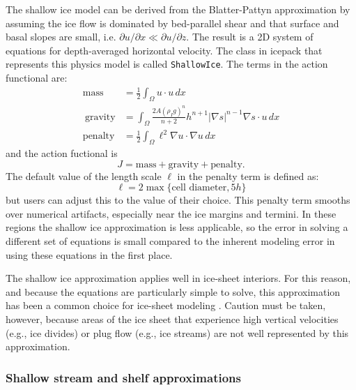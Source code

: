 \documentclass[journal abbreviation, manuscript]{copernicus}
\begin{document}
The shallow ice model can be derived from the Blatter-Pattyn approximation by assuming the ice flow is dominated by bed-parallel shear and that surface and basal slopes are small, i.e. $\partial u/\partial x \ll \partial u/\partial z$.
The result is a 2D system of equations for depth-averaged horizontal velocity.
The class in icepack that represents this physics model is called \texttt{ShallowIce}.
The terms in the action functional are:
\begin{align}
    \text{mass} & =\frac{1}{2}\int_\Omega u\cdot u\,dx\\\
    \text{gravity} & = \int_\Omega\frac{2A(\rho_I g)^n}{n+2} h^{n + 1}|\nabla s|^{n - 1}\nabla s\cdot u\,dx\\
    \text{penalty} & = \frac{1}{2}\int_\Omega \ell^2\nabla u\cdot \nabla u\,dx
\end{align}
and the action fuctional is
\begin{equation}
    J = \text{mass} + \text{gravity} + \text{penalty}.
\end{equation}
The default value of the length scale $\ell$ in the penalty term is defined as:
\begin{equation}
    \ell = 2\max\{\text{cell diameter}, 5h\}
\end{equation}
but users can adjust this to the value of their choice.
This penalty term smooths over numerical artifacts, especially near the ice margins and termini.
In these regions the shallow ice approximation is less applicable, so the error in solving a different set of equations is small compared to the inherent modeling error in using these equations in the first place.

The shallow ice approximation applies well in ice-sheet interiors.
For this reason, and because the equations are particularly simple to solve, this approximation has been a common choice for ice-sheet modeling \citep{kirchner2016shallow}.
Caution must be taken, however, because areas of the ice sheet that experience high vertical velocities (e.g., ice divides) or plug flow (e.g., ice streams) are not well represented by this approximation.

\subsubsection{Shallow stream and shelf approximations}
\end{document}
